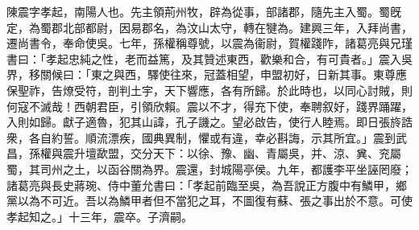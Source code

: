 
\begin{pinyinscope}
陳震字孝起，南陽人也。先主領荊州牧，辟為從事，部諸郡，隨先主入蜀。蜀旣定，為蜀郡北部都尉，因易郡名，為汶山太守，轉在犍為。建興三年，入拜尚書，遷尚書令，奉命使吳。七年，孫權稱尊號，以震為衞尉，賀權踐阼，諸葛亮與兄瑾書曰：「孝起忠純之性，老而益篤，及其贊述東西，歡樂和合，有可貴者。」震入吳界，移關候曰：「東之與西，驛使往來，冠蓋相望，申盟初好，日新其事。東尊應保聖祚，告燎受符，剖判土宇，天下響應，各有所歸。於此時也，以同心討賊，則何寇不滅哉！西朝君臣，引領欣賴。震以不才，得充下使，奉聘叙好，踐界踊躍，入則如歸。獻子適魯，犯其山諱，孔子譏之。望必啟告，使行人睦焉。即日張旍誥衆，各自約誓。順流漂疾，國典異制，懼或有違，幸必斟誨，示其所宜。」震到武昌，孫權與震升壇歃盟，交分天下：以徐、豫、幽、青屬吳，并、涼、兾、兖屬蜀，其司州之土，以函谷關為界。震還，封城陽亭侯。九年，都護李平坐誣罔廢；諸葛亮與長史蔣琬、侍中董允書曰：「孝起前臨至吳，為吾說正方腹中有鱗甲，鄉黨以為不可近。吾以為鱗甲者但不當犯之耳，不圖復有蘇、張之事出於不意。可使孝起知之。」十三年，震卒。子濟嗣。


\end{pinyinscope}